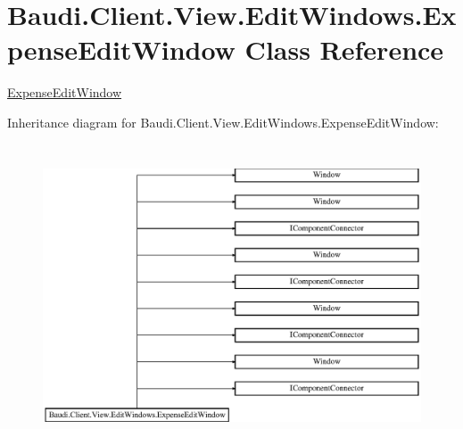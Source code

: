 \hypertarget{class_baudi_1_1_client_1_1_view_1_1_edit_windows_1_1_expense_edit_window}{}\section{Baudi.\+Client.\+View.\+Edit\+Windows.\+Expense\+Edit\+Window Class Reference}
\label{class_baudi_1_1_client_1_1_view_1_1_edit_windows_1_1_expense_edit_window}


\hyperlink{class_baudi_1_1_client_1_1_view_1_1_edit_windows_1_1_expense_edit_window}{Expense\+Edit\+Window}  


Inheritance diagram for Baudi.\+Client.\+View.\+Edit\+Windows.\+Expense\+Edit\+Window\+:\begin{figure}[H]
\begin{center}
\leavevmode
\includegraphics[height=8.974360cm]{class_baudi_1_1_client_1_1_view_1_1_edit_windows_1_1_expense_edit_window}
\end{center}
\end{figure}
